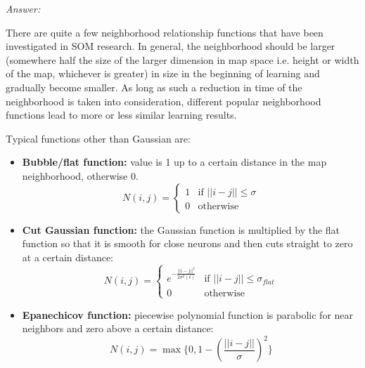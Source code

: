 \textit{Answer:}

There are quite a few neighborhood relationship functions that have been investigated in SOM research.
In general, the neighborhood should be larger (somewhere half the size of the larger dimension in map space i.e. height or width of the map, whichever is greater) in size in the beginning of learning and gradually become smaller.
As long as such a reduction in time of the neighborhood is taken into consideration, different popular neighborhood functions lead to more or less similar learning results.

Typical functions other than Gaussian are:
\begin{itemize}
    \item \textbf{Bubble/flat function:} value is 1 up to a certain distance in the map neighborhood, otherwise 0.
    \begin{equation}
    N(i,j) =
    \begin{cases}
    1 & \text{if } ||i-j|| \leq \sigma \\
    0 & \text{otherwise}
    \end{cases}
    \end{equation}
    \item \textbf{Cut Gaussian function:} the Gaussian function is multiplied by the flat function so that it is smooth for close neurons and then cuts straight to zero at a certain distance:
    \begin{equation}
    N(i,j) =
    \begin{cases}
    e^{-\frac{||i-j||^2}{2\sigma^2(t)}}
      & \text{if } ||i-j|| \leq \sigma_{flat} \\
    0 & \text{otherwise}
    \end{cases}
    \end{equation}
    \item \textbf{Epanechicov function:} piecewise polynomial function is parabolic for near neighbors and zero above a certain distance:
    \begin{equation}
    N(i,j) =
    \max \Big\{0, 1 - (\frac{||i-j||}{\sigma})^2\Big\}
    \end{equation}

\end{itemize}



